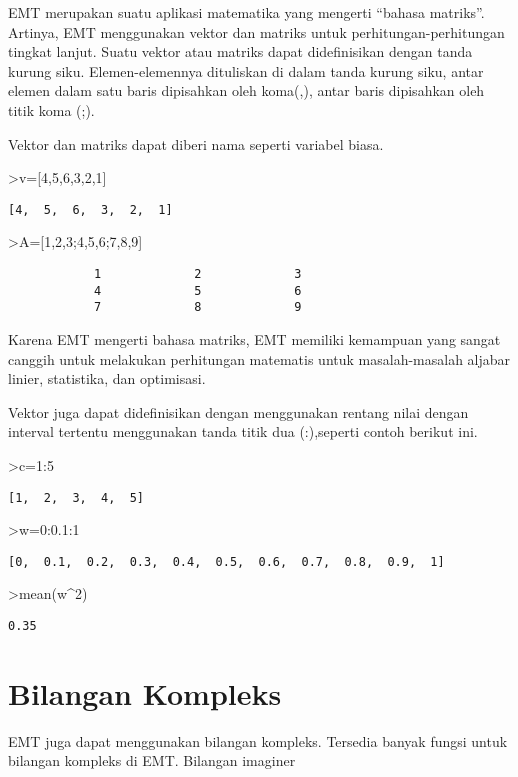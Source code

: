 \documentclass[
]{book}
\begin{document}
EMT merupakan suatu aplikasi matematika yang mengerti ``bahasa matriks''. Artinya, EMT menggunakan vektor dan matriks untuk perhitungan-perhitungan tingkat lanjut. Suatu vektor atau matriks dapat didefinisikan dengan tanda kurung siku. Elemen-elemennya dituliskan di dalam tanda kurung siku, antar elemen dalam satu baris dipisahkan oleh koma(,), antar baris dipisahkan oleh titik koma (;).

Vektor dan matriks dapat diberi nama seperti variabel biasa.

\textgreater v={[}4,5,6,3,2,1{]}

\begin{verbatim}
[4,  5,  6,  3,  2,  1]
\end{verbatim}

\textgreater A={[}1,2,3;4,5,6;7,8,9{]}

\begin{verbatim}
            1             2             3 
            4             5             6 
            7             8             9 
\end{verbatim}

Karena EMT mengerti bahasa matriks, EMT memiliki kemampuan yang sangat canggih untuk melakukan perhitungan matematis untuk masalah-masalah aljabar linier, statistika, dan optimisasi.

Vektor juga dapat didefinisikan dengan menggunakan rentang nilai dengan interval tertentu menggunakan tanda titik dua (:),seperti contoh berikut ini.

\textgreater c=1:5

\begin{verbatim}
[1,  2,  3,  4,  5]
\end{verbatim}

\textgreater w=0:0.1:1

\begin{verbatim}
[0,  0.1,  0.2,  0.3,  0.4,  0.5,  0.6,  0.7,  0.8,  0.9,  1]
\end{verbatim}

\textgreater mean(w\^{}2)

\begin{verbatim}
0.35
\end{verbatim}

\chapter{Bilangan Kompleks}\label{bilangan-kompleks}

EMT juga dapat menggunakan bilangan kompleks. Tersedia banyak fungsi untuk bilangan kompleks di EMT. Bilangan imaginer
\end{document}
